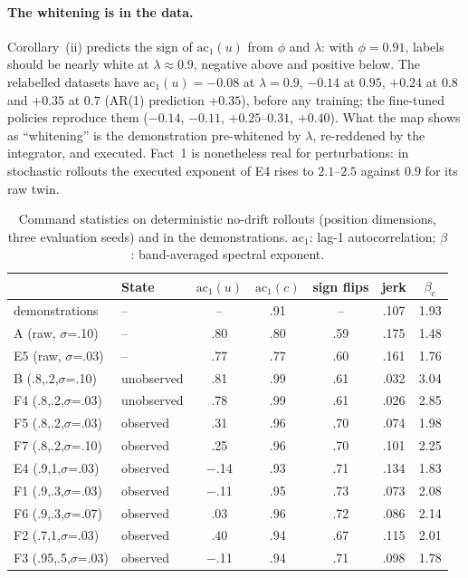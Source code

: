 \documentclass{article}
\begin{document}
\paragraph{The whitening is in the data.} Corollary~(ii) predicts the sign of $\mathrm{ac}_1(u)$ from $\phi$ and $\lambda$: with $\phi=0.91$, labels should be nearly white at $\lambda\approx0.9$, negative above and positive below. The relabelled datasets have $\mathrm{ac}_1(u)=-0.08$ at $\lambda=0.9$, $-0.14$ at $0.95$, $+0.24$ at $0.8$ and $+0.35$ at $0.7$ (AR(1) prediction $+0.35$), before any training; the fine-tuned policies reproduce them ($-0.14$, $-0.11$, $+0.25$--$0.31$, $+0.40$). What the map shows as ``whitening'' is the demonstration pre-whitened by $\lambda$, re-reddened by the integrator, and executed. Fact~1 is nonetheless real for perturbations: in stochastic rollouts the executed exponent of E4 rises to $2.1$--$2.5$ against $0.9$ for its raw twin.

\begin{table}[t]
\centering
\caption{Command statistics on deterministic no-drift rollouts (position dimensions, three evaluation seeds) and in the demonstrations. $\mathrm{ac}_1$: lag-1 autocorrelation; $\beta$: band-averaged spectral exponent.}
\label{tab:white}
\small
\begin{tabular}{l l cc c c c}
\toprule
& State & $\mathrm{ac}_1(u)$ & $\mathrm{ac}_1(c)$ & sign flips & jerk & $\beta_c$ \\
\midrule
demonstrations & -- & -- & .91 & -- & .107 & 1.93 \\
A (raw, $\sigma$=.10) & -- & .80 & .80 & .59 & .175 & 1.48 \\
E5 (raw, $\sigma$=.03) & -- & .77 & .77 & .60 & .161 & 1.76 \\
B (.8,.2,$\sigma$=.10) & unobserved & .81 & .99 & .61 & .032 & 3.04 \\
F4 (.8,.2,$\sigma$=.03) & unobserved & .78 & .99 & .61 & .026 & 2.85 \\
F5 (.8,.2,$\sigma$=.03) & observed & .31 & .96 & .70 & .074 & 1.98 \\
F7 (.8,.2,$\sigma$=.10) & observed & .25 & .96 & .70 & .101 & 2.25 \\
E4 (.9,1,$\sigma$=.03) & observed & $-$.14 & .93 & .71 & .134 & 1.83 \\
F1 (.9,.3,$\sigma$=.03) & observed & $-$.11 & .95 & .73 & .073 & 2.08 \\
F6 (.9,.3,$\sigma$=.07) & observed & .03 & .96 & .72 & .086 & 2.14 \\
F2 (.7,1,$\sigma$=.03) & observed & .40 & .94 & .67 & .115 & 2.01 \\
F3 (.95,.5,$\sigma$=.03) & observed & $-$.11 & .94 & .71 & .098 & 1.78 \\
\bottomrule
\end{tabular}
\end{table}
\end{document}
